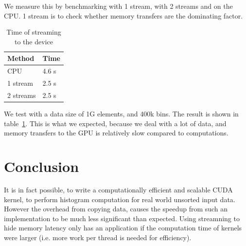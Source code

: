 \documentclass[12pt, a4paper, hidelinks]{article}
\begin{document}
We measure this by benchmarking with 1 stream, with 2 streams and on the CPU. 1 stream
is to check whether memory transfers are the dominating factor.

\begin{table}[htpb]
    \centering
    \begin{tabular}{l l}
        Method & Time \\
        \hline
        CPU & 4.6 s \\
        1 stream  & 2.5 s \\
        2 streams & 2.5 s \\
        \hline
    \end{tabular}
    \caption{Time of streaming to the device}
    \label{tab:stream}
\end{table}

We test with a data size of 1G elements, and 400k bins. The result is shown in table~\ref{tab:stream}.
This is what we expected, because we deal with a lot of data, and memory transfers to the GPU is
relatively slow compared to computations.

\section{Conclusion}
It is in fact possible, to write a computationally efficient and scalable CUDA kernel,
to perform histogram computation for real world unsorted input data.
However the overhead from copying data,
causes the speedup from such an implementation to be much less significant than expected. Using streamning to hide memory latency only has an application if the computation time of kernels were larger (i.e. more work per thread is needed for efficiency).


\end{document}

